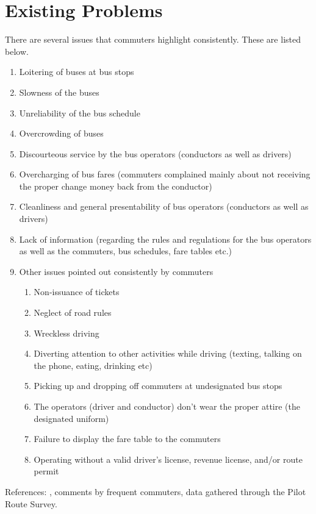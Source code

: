 \documentclass[12pt, oneside]{report}
\begin{document}
\section{Existing Problems}
\label{section-ExistingProblems}
There are several issues that commuters highlight consistently. These are listed below. 
\begin {enumerate}
\item Loitering of buses at bus stops
\item Slowness of the buses
\item Unreliability of the bus schedule
\item Overcrowding of buses
\item Discourteous service by the bus operators (conductors as well as drivers)
\item Overcharging of bus fares (commuters complained mainly about not receiving the proper change money back from the conductor)
\item Cleanliness and general presentability of bus operators (conductors as well as drivers)
\item Lack of information (regarding the rules and regulations for the bus operators as well as the commuters, bus schedules, fare tables etc.)
\item Other issues pointed out consistently by commuters
	\begin {enumerate}
	\item Non-issuance of tickets
	\item Neglect of road rules
	\item Wreckless driving
	\item Diverting attention to other activities while driving (texting, talking on the phone, eating, drinking etc)
	\item Picking up and dropping off commuters at undesignated bus stops
	\item The operators (driver and conductor) don't wear the proper attire (the designated uniform)
	\item Failure to display the fare table to the commuters
	\item Operating without a valid driver's license, revenue license, and/or route permit
	\end {enumerate}
\end {enumerate}
References: \citep{Wickremasekara2012, Range2012}, comments by frequent commuters, data gathered through the Pilot Route Survey.

\newpage
\end{document}
